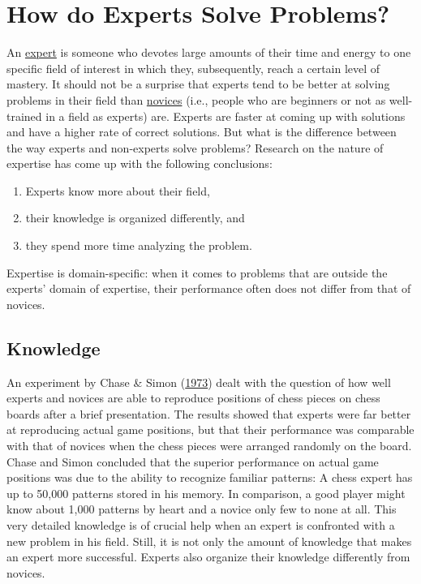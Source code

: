 \documentclass[
]{krantz}
\begin{document}
\hypertarget{how-do-experts-solve-problems}{%
\section{How do Experts Solve Problems?}\label{how-do-experts-solve-problems}}

An \protect\hyperlink{expert}{expert} is someone who devotes large amounts of their time and energy to one specific field of interest in which they, subsequently, reach a certain level of mastery. It should not be a surprise that experts tend to be better at solving problems in their field than \href{novice}{novices} (i.e., people who are beginners or not as well-trained in a field as experts) are. Experts are faster at coming up with solutions and have a higher rate of correct solutions. But what is the difference between the way experts and non-experts solve problems? Research on the nature of expertise has come up with the following conclusions:

\begin{enumerate}
\def\labelenumi{\arabic{enumi}.}
\item
  Experts know more about their field,
\item
  their knowledge is organized differently, and
\item
  they spend more time analyzing the problem.
\end{enumerate}

Expertise is domain-specific: when it comes to problems that are outside the experts' domain of expertise, their performance often does not differ from that of novices.

\hypertarget{knowledge-1}{%
\subsection*{Knowledge}\label{knowledge-1}}


An experiment by Chase \& Simon (\protect\hyperlink{ref-Chase1973}{1973}) dealt with the question of how well experts and novices are able to reproduce positions of chess pieces on chess boards after a brief presentation. The results showed that experts were far better at reproducing actual game positions, but that their performance was comparable with that of novices when the chess pieces were arranged randomly on the board. Chase and Simon concluded that the superior performance on actual game positions was due to the ability to recognize familiar patterns: A chess expert has up to 50,000 patterns stored in his memory. In comparison, a good player might know about 1,000 patterns by heart and a novice only few to none at all. This very detailed knowledge is of crucial help when an expert is confronted with a new problem in his field. Still, it is not only the amount of knowledge that makes an expert more successful. Experts also organize their knowledge differently from novices.
\end{document}
